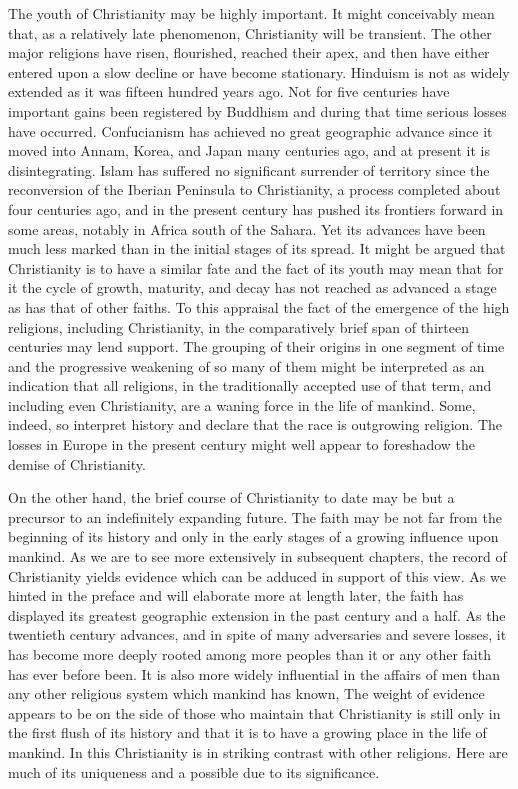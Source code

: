 The youth of Christianity may be highly important. It might conceivably mean that, as a relatively late phenomenon, Christianity will be transient. The other major religions have risen, flourished, reached their apex, and then have either entered upon a slow decline or have become stationary. Hinduism is not as widely extended as it was fifteen hundred years ago. Not for five centuries have important gains been registered by Buddhism and during that time serious losses have occurred. Confucianism has achieved no great geographic advance since it moved into Annam, Korea, and Japan many centuries ago, and at present it is disintegrating. Islam has suffered no significant surrender of territory since the reconversion of the Iberian Peninsula to Christianity, a process completed about four centuries ago, and in the present century has pushed its frontiers forward in some areas, notably in Africa south of the Sahara. Yet its advances have been much less marked than in the initial stages of its spread. It might be argued that Christianity is to have a similar fate and the fact of its youth may mean that for it the cycle of growth, maturity, and decay has not reached as advanced a stage as has that of other faiths. To this appraisal the fact of the emergence of the high religions, including Christianity, in the comparatively brief span of thirteen centuries may lend support. The grouping of their origins in one segment of time and the progressive weakening of so many of them might be interpreted as an indication that all religions, in the traditionally accepted use of that term, and including even Christianity, are a waning force in the life of mankind. Some, indeed, so interpret history and declare that the race is outgrowing religion. The losses in Europe in the present century might well appear to foreshadow the demise of Christianity.

On the other hand, the brief course of Christianity to date may be but a precursor to an indefinitely expanding future. The faith may be not far from the beginning of its history and only in the early stages of a growing influence upon mankind. As we are to see more extensively in subsequent chapters, the record of Christianity yields evidence which can be adduced in support of this view. As we hinted in the preface and will elaborate more at length later, the faith has displayed its greatest geographic extension in the past century and a half. As the twentieth century advances, and in spite of many adversaries and severe losses, it has become more deeply rooted among more peoples than it or any other faith has ever before been. It is also more widely influential in the affairs of men than any other religious system which mankind has known, The weight of evidence appears to be on the side of those who maintain that Christianity is still only in the first flush of its history and that it is to have a growing place in the life of mankind. In this Christianity is in striking contrast with other religions. Here are much of its uniqueness and a possible due to its significance.

